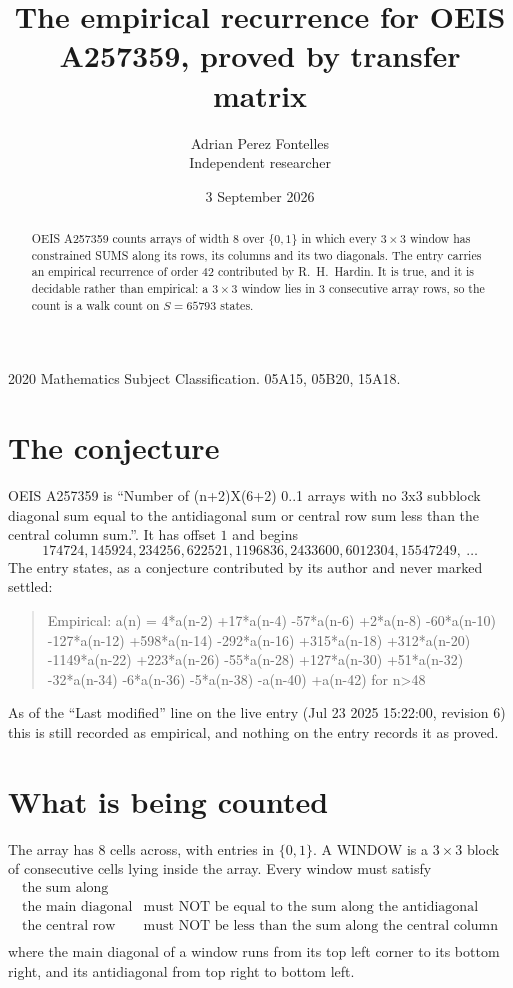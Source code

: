 \documentclass[11pt,a4paper]{article}
\title{The empirical recurrence for OEIS A257359, proved by transfer matrix}
\author{Adrian Perez Fontelles\\ \small Independent researcher}
\date{3 September 2026}
\theoremstyle{plain}
\theoremstyle{definition}
\begin{document}
\maketitle

\begin{abstract}
OEIS A257359 counts arrays of width $8$ over $\{0,1\}$ in which every $3\times3$ window has
constrained SUMS along its rows, its columns and its two diagonals. The entry carries an
empirical recurrence of order $42$ contributed by R.~H.~Hardin. It is true, and it is
decidable rather than empirical: a $3\times3$ window lies in $3$ consecutive array rows,
so the count is a walk count on $S=65793$ states.
\end{abstract}

\noindent\small 2020 Mathematics Subject Classification. 05A15, 05B20, 15A18.\normalsize

\section{The conjecture}

OEIS A257359 is ``Number of (n+2)X(6+2) 0..1 arrays with no 3x3 subblock diagonal sum equal to the antidiagonal sum or central row sum less than the central column sum.''. It has offset $1$ and begins
\[
174724, 145924, 234256, 622521, 1196836, 2433600, 6012304, 15547249,\ \dots
\]
The entry states, as a conjecture contributed by its author and never marked settled:
\begin{quote}
Empirical: a(n) = 4*a(n-2) +17*a(n-4) -57*a(n-6) +2*a(n-8) -60*a(n-10) -127*a(n-12) +598*a(n-14) -292*a(n-16) +315*a(n-18) +312*a(n-20) -1149*a(n-22) +223*a(n-26) -55*a(n-28) +127*a(n-30) +51*a(n-32) -32*a(n-34) -6*a(n-36) -5*a(n-38) -a(n-40) +a(n-42) for n>48
\end{quote}
As of the ``Last modified'' line on the live entry (Jul 23 2025 15:22:00, revision 6) this is still
recorded as empirical, and nothing on the entry records it as proved.

\section{What is being counted}

The array has $8$ cells across, with entries in $\{0,1\}$. A WINDOW is a $3\times3$ block
of consecutive cells lying inside the array. Every window must satisfy
\[
\begin{array}{ll}
\text{the sum along} & \text{} \\[2pt]
\text{the main diagonal} & \text{must NOT be equal to the sum along the antidiagonal} \\
\text{the central row} & \text{must NOT be less than the sum along the central column} \\
\end{array}
\]
where the main diagonal of a window runs from its top left corner to its bottom right, and its
antidiagonal from top right to bottom left.
\end{document}
